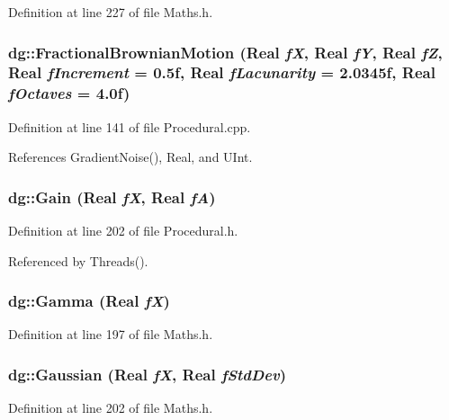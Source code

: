 Definition at line 227 of file Maths.h.
\subsubsection{ dg::Fractional\-Brownian\-Motion ({\bf Real} {\em f\-X}, {\bf Real} {\em f\-Y}, {\bf Real} {\em f\-Z}, {\bf Real} {\em f\-Increment} = 0.5f, {\bf Real} {\em f\-Lacunarity} = 2.0345f, {\bf Real} {\em f\-Octaves} = 4.0f)}\label{namespacedg_a130}




Definition at line 141 of file Procedural.cpp.

References Gradient\-Noise(), Real, and UInt.
\subsubsection{ dg::Gain ({\bf Real} {\em f\-X}, {\bf Real} {\em f\-A})\hspace{0.3cm}{\tt  [inline]}}\label{namespacedg_a151}




Definition at line 202 of file Procedural.h.

Referenced by Threads().
\subsubsection{ dg::Gamma ({\bf Real} {\em f\-X})\hspace{0.3cm}{\tt  [inline]}}\label{namespacedg_a103}




Definition at line 197 of file Maths.h.
\subsubsection{ dg::Gaussian ({\bf Real} {\em f\-X}, {\bf Real} {\em f\-Std\-Dev})\hspace{0.3cm}{\tt  [inline]}}\label{namespacedg_a104}




Definition at line 202 of file Maths.h.

